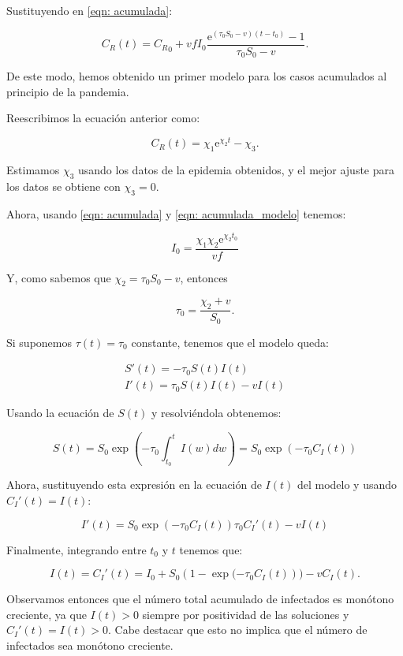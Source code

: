 Sustituyendo en \eqref{eqn: acumulada}:

$$C_R(t) = {C_R}_0 + vfI_0\frac{\mathrm{e}^{(\tau_0 S_0 -v)(t-t_0)} -1}{\tau_0 S_0-v}.$$

De este modo, hemos obtenido un primer modelo para los casos acumulados al principio de la pandemia.

Reescribimos la ecuación anterior como:

\begin{equation}
\label{eqn: acumulada_modelo}
C_R(t) = \chi_1 \mathrm{e}^{\chi_2 t} -\chi_3.
\end{equation}

Estimamos $\chi_3$ usando los datos de la epidemia obtenidos, y el mejor ajuste para los datos se obtiene con $\chi_3=0$.

Ahora, usando \eqref{eqn: acumulada} y \eqref{eqn: acumulada_modelo} tenemos:

\begin{equation}
I_0=\frac{\chi_1\chi_2\mathrm{e}^{\chi_2 t_0}}{vf}
\end{equation}

Y, como sabemos que $\chi_2 = \tau_0 S_0-v$, entonces

\begin{equation}
\tau_0 = \frac{\chi_2+v}{S_0}.
\end{equation}

Si suponemos $\tau (t) = \tau_0$ constante, tenemos que el modelo queda:

\begin{equation}
\begin{aligned}
S'(t) = -\tau_0S(t)I(t) \\
I'(t) = \tau_0S(t)I(t) -vI(t)
\end{aligned}
\end{equation}

Usando la ecuación de $S(t)$ y resolviéndola obtenemos:

$$S(t) = S_0\exp{\left( -\tau_0 \int_{t_0}^t I(w) dw \right)} = S_0\exp{(-\tau_0 C_I(t))}$$

Ahora, sustituyendo esta expresión en la ecuación de $I(t)$ del modelo y usando $C_I'(t)=I(t)$:

$$I'(t) = S_0\exp{\left( -\tau_0 C_I(t)\right) }\tau_0 C_I'(t)-vI(t)$$

Finalmente, integrando entre $t_0$ y $t$ tenemos que:

$$I(t)=C_I'(t)=I_0+S_0(1-\exp{(-\tau_0 C_I(t)}))-vC_I(t).$$
 
Observamos entonces que el número total acumulado de infectados es monótono creciente, ya que $I(t)>0$ siempre por positividad de las soluciones y $C_I'(t)=I(t)>0$. Cabe destacar que esto no implica que el número de infectados sea monótono creciente.

